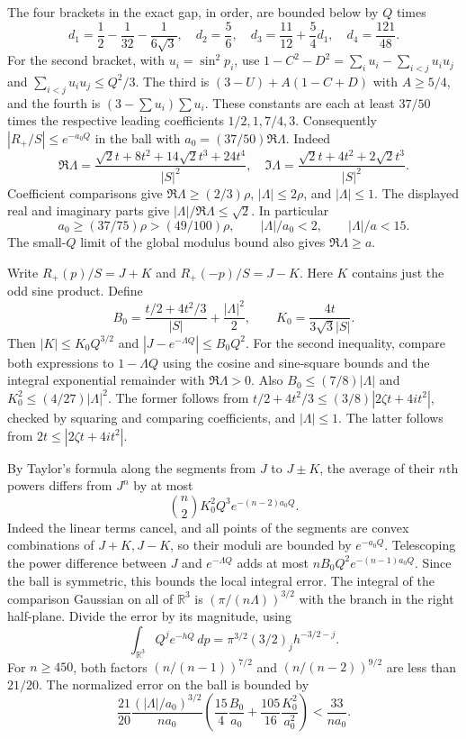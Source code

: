 \documentclass[11pt]{article}
\begin{document}
The four brackets in the exact gap, in order, are bounded below by $Q$ times
\[
d_1=\frac12-\frac1{32}-\frac1{6\sqrt3},\quad
d_2=\frac56,\quad
d_3=\frac{11}{12}+\frac54d_1,\quad
d_4=\frac{121}{48}.
\]
For the second bracket, with $u_i=\sin^2p_i$, use $1-C^2-D^2=\sum_i u_i-\sum_{i<j}u_i u_j$ and $\sum_{i<j}u_i u_j\le Q^2/3$. The third is $(3-U)+A(1-C+D)$ with $A\ge5/4$, and the fourth is $(3-\sum u_i)\sum u_i$. These constants are each at least $37/50$ times the respective leading coefficients $1/2,1,7/4,3$. Consequently $|R_+/S|\le e^{-a_0Q}$ in the ball with $a_0=(37/50)\Re\Lambda$. Indeed
\[
\Re\Lambda=\frac{\sqrt2t+8t^2+14\sqrt2t^3+24t^4}{|S|^2},
\quad
\Im\Lambda=\frac{\sqrt2t+4t^2+2\sqrt2t^3}{|S|^2}.
\]
Coefficient comparisons give $\Re\Lambda\ge(2/3)\rho$, $|\Lambda|\le2\rho$, and $|\Lambda|\le1$. The displayed real and imaginary parts give $|\Lambda|/\Re\Lambda\le\sqrt2$. In particular
\[
a_0\ge(37/75)\rho>(49/100)\rho,\qquad |\Lambda|/a_0<2,\qquad |\Lambda|/a<15.
\]
The small-$Q$ limit of the global modulus bound also gives $\Re\Lambda\ge a$.

Write $R_+(p)/S=J+K$ and $R_+(-p)/S=J-K$. Here $K$ contains just the odd sine product. Define
\[
B_0=\frac{t/2+4t^2/3}{|S|}+\frac{|\Lambda|^2}{2},\qquad
K_0=\frac{4t}{3\sqrt3|S|}.
\]
Then $|K|\le K_0Q^{3/2}$ and $|J-e^{-\Lambda Q}|\le B_0 Q^2$. For the second inequality, compare both expressions to $1-\Lambda Q$ using the cosine and sine-square bounds and the integral exponential remainder with $\Re\Lambda>0$. Also $B_0\le(7/8)|\Lambda|$ and $K_0^2\le(4/27)|\Lambda|^2$. The former follows from $t/2+4t^2/3\le (3/8)|2\zeta t+4it^2|$, checked by squaring and comparing coefficients, and $|\Lambda|\le1$. The latter follows from $2t\le |2\zeta t+4it^2|$.

By Taylor's formula along the segments from $J$ to $J\pm K$, the average of their $n$th powers differs from $J^n$ by at most
\[
\binom n2 K_0^2 Q^3e^{-(n-2)a_0Q}.
\]
Indeed the linear terms cancel, and all points of the segments are convex combinations of $J+K,J-K$, so their moduli are bounded by $e^{-a_0Q}$. Telescoping the power difference between $J$ and $e^{-\Lambda Q}$ adds at most $nB_0 Q^2e^{-(n-1)a_0Q}$. Since the ball is symmetric, this bounds the local integral error. The integral of the comparison Gaussian on all of $\mathbb R^3$ is $(\pi/(n\Lambda))^{3/2}$ with the branch in the right half-plane. Divide the error by its magnitude, using
\[
\int_{\mathbb R^3} Q^j e^{-hQ}\,dp
=\pi^{3/2}(3/2)_j h^{-3/2-j}.
\]
For $n\ge450$, both factors $(n/(n-1))^{7/2}$ and $(n/(n-2))^{9/2}$ are less than $21/20$. The normalized error on the ball is bounded by
\[
\frac{21}{20}\frac{(|\Lambda|/a_0)^{3/2}}{n a_0}
\left(\frac{15}{4}\frac{B_0}{a_0}+\frac{105}{16}\frac{K_0^2}{a_0^2}\right)
<\frac{33}{n a_0}.
\]
\end{document}
